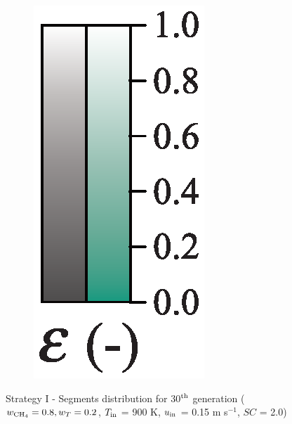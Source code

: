 \documentclass[preprint,12pt]{elsarticle}
\begin{document}
\begin{figure}
\begin{subfigure}[b]{0.1\textwidth}
     	\includegraphics[width=\textwidth]{segments_porosity.eps}
     \end{subfigure}
\caption{\label{fig:30L6040G1-TField} Strategy I - Segments distribution for 30$^{\rm{th}}$ generation ($w_{\rm{CH_4}} = 0.8, w_T = 0.2$, $T_{\rm{in}}$ = 900 K, $u_{\rm{in}}$ = 0.15 m s$^{-1}$, $SC$ = 2.0)}
\end{figure}
\end{document}
